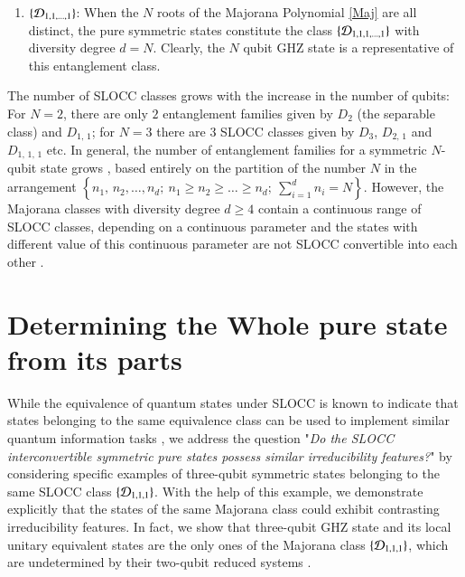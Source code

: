 {\begin{enumerate}
Dicke states $\left\vert \frac{N}{2}, k-\frac{N}{2}\right\rangle$ are the representative states of the entanglement class $\{{\cal D}_{N-k,k}\}$ with two independent spinors  and clearly, they are all inequivalent under  SLOCC (as the degeneracy classification  is different for each $k=1,2, \ldots [N/2]$).

\item $\{{\cal D}_{1,1,\ldots, 1}\}$:  When the $N$ roots of the Majorana Polynomial \eqref{Maj} are all distinct, the pure symmetric states constitute  the class $\{ {\cal D}_{1,1,1,\ldots, 1}\}$ with diversity degree  $d=N$. Clearly, the $N$ qubit GHZ state is a representative of this entanglement class. 
\end{enumerate}
The number of SLOCC classes  grows  with the increase in the number of qubits: For $N=2$, there are only $2$ entanglement families given by 
$D_{2}$ (the separable class) and $D_{1,\,1}$; for $N=3$ there are $3$ SLOCC classes given by $D_{3}$, $D_{2,\,1}$ and $D_{1,\,1,\,1} $ etc.  In general, the number of entanglement families for a symmetric $N$-qubit state grows \cite{solano}, based entirely on the partition of the number $N$ in the arrangement $\left\{n_1,\,n_2,\ldots ,n_d;\ n_1\geq n_2\geq\ldots\geq n_d;\   \sum_{i=1}^{d} n_i=N\right\}$. However, the Majorana classes  with diversity degree $d\geq 4$ contain a continuous range of SLOCC classes, depending on a continuous  parameter and the states with different value of this continuous  parameter  are not SLOCC convertible into each other \cite{solano}. 

  
\section{Determining the Whole pure state from its parts}\label{chap29-eqIV} 

While the equivalence of quantum states under SLOCC is known to indicate that states belonging to the same equivalence class can be used to implement similar quantum information tasks \cite{Dur}, we address the question "{\emph{Do the {\rm SLOCC} interconvertible symmetric pure states possess similar irreducibility features?}}" by considering specific examples of three-qubit symmetric states belonging to the same SLOCC class $\{{\cal D}_{1,1,1}\}$.  With the help of this example, we demonstrate explicitly that the states of the same Majorana class could exhibit contrasting irreducibility features. In fact, we show that three-qubit GHZ state and its local unitary equivalent states are the only ones of the Majorana class $\{{\cal D}_{1,1,1}\}$,  which are undetermined by their two-qubit reduced systems \cite{SP1,Walck,Walck2}. 

}
